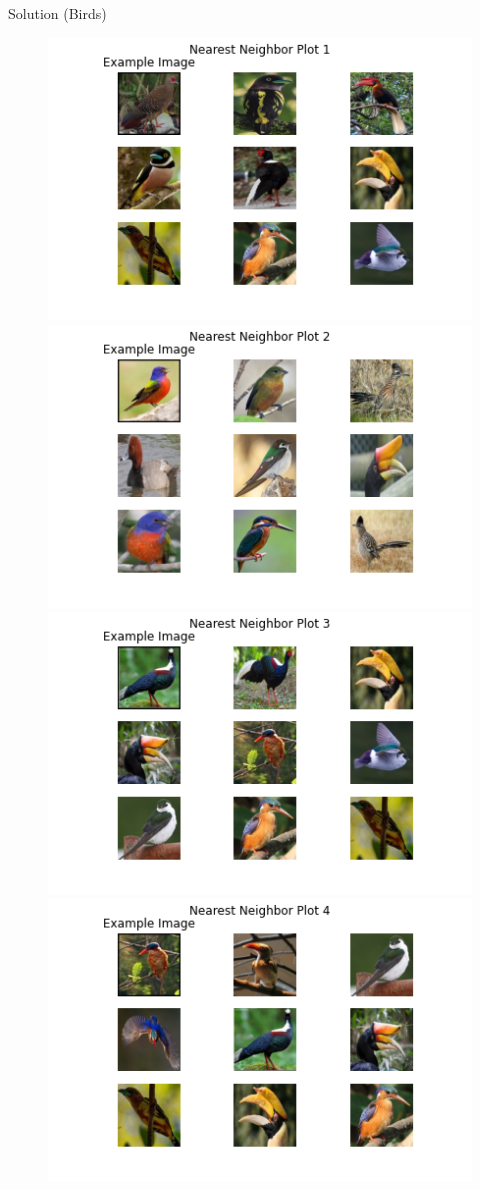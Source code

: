 \documentclass{beamer}
\begin{document}
	\begin{frame}[t]{Solution (Birds)}
		\begin{figure}
			\includegraphics[scale=0.2]{birds0.png}
			\includegraphics[scale=0.2]{birds1.png}
			\includegraphics[scale=0.2]{birds2.png}
			\includegraphics[scale=0.2]{birds3.png}

\end{figure}
\end{frame}
\end{document}

